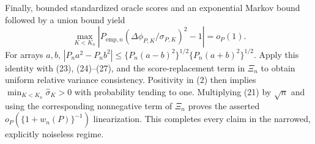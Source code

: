 Finally, bounded standardized oracle scores and an exponential Markov bound followed by a union bound yield
\[
 \max_{K<K_n}|P_{\mathrm{emp},n}(\Delta\phi_{P,K}/\sigma_{P,K})^2-1|=o_P(1).    \tag{27}
\]
For arrays \(a,b\), \(|P_na^2-P_nb^2|\leq\{P_n(a-b)^2\}^{1/2}\{P_n(a+b)^2\}^{1/2}\).  Apply this identity with (23), (24)--(27), and the score-replacement term in \(\Xi_n\) to obtain uniform relative variance consistency.  Positivity in (2) then implies \(\min_{K<K_n}\widehat\sigma_K>0\) with probability tending to one.  Multiplying (21) by \(\sqrt n\) and using the corresponding nonnegative term of \(\Xi_n\) proves the asserted \(o_P(\{1+w_n(P)\}^{-1})\) linearization.  This completes every claim in the narrowed, explicitly noiseless regime.